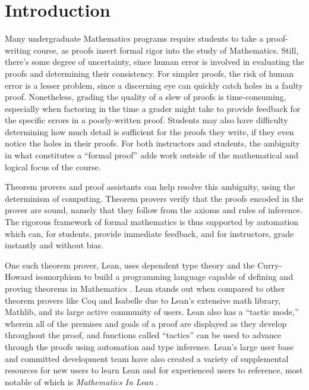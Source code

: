 
\chapter{Introduction}

Many undergraduate Mathematics programs require students to take 
a proof-writing course, as proofs insert formal rigor into the 
study of Mathematics. Still, there’s some degree of uncertainty, 
since human error is involved in evaluating the proofs and 
determining their consistency. For 
simpler proofs, the risk of human error is a lesser problem, 
since a discerning eye can quickly catch holes in a faulty proof. 
Nonetheless, grading the quality of a slew of proofs is 
time-consuming, especially when factoring in the time a grader 
might take to provide feedback for the specific errors in a 
poorly-written proof. Students may also have difficulty
determining how much detail is sufficient for the proofs they
write, if they even notice the holes in their proofs. For 
both instructors and students, the ambiguity in what constitutes
a ``formal proof'' adds work outside of the mathematical and 
logical focus of the course.

Theorem provers and proof assistants can help resolve this ambiguity,
using the determinism of computing. Theorem provers verify that
the proofs encoded in the prover are sound, namely that they follow
from the axioms and rules of inference. The rigorous framework
of formal mathematics is thus supported by automation which can, 
for students, provide immediate feedback, 
and for instructors, grade instantly and without bias.

One such theorem prover, Lean,
uses dependent type theory and the Curry-Howard isomorphism 
to build a programming language capable of defining and proving 
theorems in Mathematics \cite{TPiL}. Lean stands out when compared to other
theorem provers like Coq and Isabelle due to Lean's
extensive math library, Mathlib, and its large active community 
of users. Lean also has a “tactic mode,” wherein all of the 
premises and goals of a proof are displayed 
as they develop throughout the proof, and functions called 
“tactics” can be used to advance through the proofs using 
automation and type inference. Lean’s large user base and 
committed development team have also created a variety of 
supplemental resources for new users to learn Lean and for 
experienced users to reference, most notable of which is 
\textit{Mathematics In Lean} \cite{MIL}.

